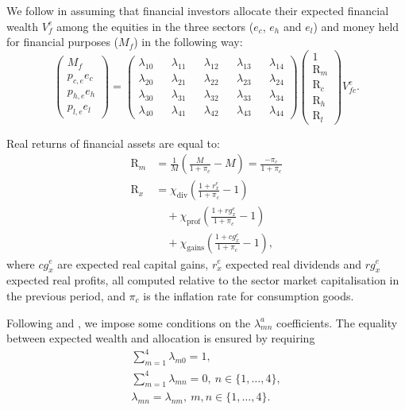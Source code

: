\documentclass[authoryear]{article}
\begin{document}
We follow \citet{Brainard1968} in assuming that financial investors allocate their expected financial wealth $V^e_{f}$ among the equities in the three sectors ($e_c$, $e_h$ and $e_l$) and money held for financial purposes ($M_f$) in the following way:
\begin{equation}
\left(
\begin{matrix} M_f \\ p_{c,e}e_c \\ p_{h,e}e_h \\ p_{l,e}e_l \end{matrix}
\right)
=\left(
\begin{matrix}
	\lambda_{10} && \lambda_{11} && \lambda_{12} && \lambda_{13} && \lambda_{14} \\
	\lambda_{20} && \lambda_{21} && \lambda_{22} && \lambda_{23} && \lambda_{24} \\
	\lambda_{30} && \lambda_{31} && \lambda_{32} && \lambda_{33} && \lambda_{34} \\
	\lambda_{40} && \lambda_{41} && \lambda_{42} && \lambda_{43} && \lambda_{44}
\end{matrix}
\right)
\left(
\begin{matrix} 1 \\ \text{R}_m \\ \text{R}_c \\ \text{R}_h \\ \text{R}_l \end{matrix}
\right) V^e_{fc}.
\label{eq:portfolio}
\end{equation}

Real returns of financial assets are equal to:
\begin{align}
\text{R}_m &= \frac{1}{M}\left(\frac{M}{1+\pi_c} - M\right) = \frac{-\pi_c}{1 + \pi_c} \label{eq:Rm} \\
\text{R}_x &= \chi_\text{div}\left(\frac{1 + r_x^e}{1 + \pi_c} - 1\right) \nonumber\\
			 &\quad + \chi_\text{prof}\left(\frac{1 + rg_x^e}{1 + \pi_c} - 1\right) \nonumber\\
			 &\quad + \chi_\text{gains}\left(\frac{1 + cg_x^e}{1 + \pi_c} - 1\right), \label{eq:Rx}
\end{align}
where $cg_x^e$ are expected real capital gains, $r_x^e$ expected real dividends and $rg^e_x$ expected real profits, all computed relative to the sector market capitalisation in the previous period, and $\pi_c$ is the inflation rate for consumption goods.

Following \citet{Godley:2007} and \citet{Caiani2014}, we impose some conditions on the $\lambda^a_{mn}$ coefficients. The equality between expected wealth and allocation is ensured by requiring
\begin{gather}
\sum_{m=1}^4 \lambda_{m0} = 1,\\
\sum_{m=1}^4 \lambda_{mn} = 0,\> n\in\{1,\ldots,4\}, \\
\lambda_{mn} = \lambda_{nm},\> m,n\in\{1,\ldots,4\}. \label{eq:simm}
\end{gather}
\end{document}
